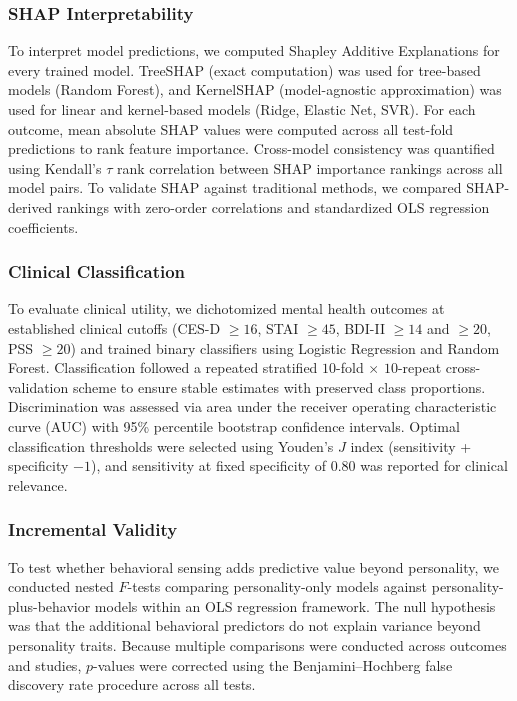 \documentclass[12pt, a4paper]{article}
\begin{document}
\subsubsection{SHAP Interpretability}

To interpret model predictions, we computed Shapley Additive Explanations \citep[SHAP;][]{lundberg2017unified} for every trained model. TreeSHAP (exact computation) was used for tree-based models (Random Forest), and KernelSHAP (model-agnostic approximation) was used for linear and kernel-based models (Ridge, Elastic Net, SVR). For each outcome, mean absolute SHAP values were computed across all test-fold predictions to rank feature importance. Cross-model consistency was quantified using Kendall's $\tau$ rank correlation between SHAP importance rankings across all model pairs. To validate SHAP against traditional methods, we compared SHAP-derived rankings with zero-order correlations and standardized OLS regression coefficients.

\subsubsection{Clinical Classification}

To evaluate clinical utility, we dichotomized mental health outcomes at established clinical cutoffs (CES-D $\geq 16$, STAI $\geq 45$, BDI-II $\geq 14$ and $\geq 20$, PSS $\geq 20$) and trained binary classifiers using Logistic Regression and Random Forest. Classification followed a repeated stratified $10$-fold $\times$ $10$-repeat cross-validation scheme to ensure stable estimates with preserved class proportions. Discrimination was assessed via area under the receiver operating characteristic curve (AUC) with 95\% percentile bootstrap confidence intervals. Optimal classification thresholds were selected using Youden's $J$ index (sensitivity + specificity $- 1$), and sensitivity at fixed specificity of 0.80 was reported for clinical relevance.

\subsubsection{Incremental Validity}

To test whether behavioral sensing adds predictive value beyond personality, we conducted nested $F$-tests comparing personality-only models against personality-plus-behavior models within an OLS regression framework. The null hypothesis was that the additional behavioral predictors do not explain variance beyond personality traits. Because multiple comparisons were conducted across outcomes and studies, $p$-values were corrected using the Benjamini--Hochberg false discovery rate \citep[BH-FDR;][]{benjamini1995controlling} procedure across all tests.
\end{document}
